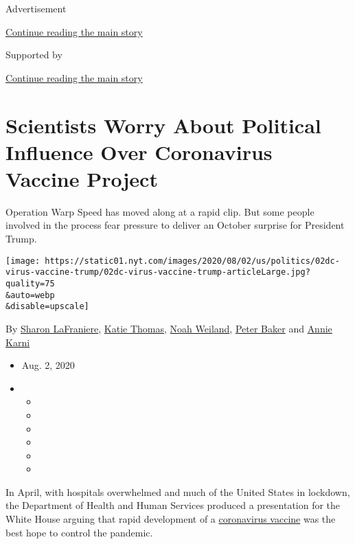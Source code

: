 Advertisement

\protect\hyperlink{after-top}{Continue reading the main story}

Supported by

\protect\hyperlink{after-sponsor}{Continue reading the main story}

\hypertarget{scientists-worry-about-political-influence-over-coronavirus-vaccine-project}{%
\section{Scientists Worry About Political Influence Over Coronavirus
Vaccine
Project}\label{scientists-worry-about-political-influence-over-coronavirus-vaccine-project}}

Operation Warp Speed has moved along at a rapid clip. But some people
involved in the process fear pressure to deliver an October surprise for
President Trump.

\texttt{[image: https://static01.nyt.com/images/2020/08/02/us/politics/02dc-virus-vaccine-trump/02dc-virus-vaccine-trump-articleLarge.jpg?quality=75\\\&auto=webp\\\&disable=upscale]}

By \href{https://www.nytimes.com/by/sharon-lafraniere}{Sharon
LaFraniere}, \href{https://www.nytimes.com/by/katie-thomas}{Katie
Thomas}, \href{https://www.nytimes.com/by/noah-weiland}{Noah Weiland},
\href{https://www.nytimes.com/by/peter-baker}{Peter Baker} and
\href{https://www.nytimes.com/by/annie-karni}{Annie Karni}

\begin{itemize}
\item
  Aug. 2, 2020
\item
  \begin{itemize}
  \item
  \item
  \item
  \item
  \item
  \item
  \end{itemize}
\end{itemize}

In April, with hospitals overwhelmed and much of the United States in
lockdown, the Department of Health and Human Services produced a
presentation for the White House arguing that rapid development of a
\href{https://www.nytimes.com/interactive/2020/science/coronavirus-vaccine-tracker.html}{coronavirus
vaccine} was the best hope to control the pandemic.

